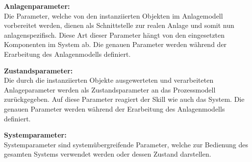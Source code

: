 	\textbf{Anlagenparameter:}
	\vspace{2mm} 
	\\
	Die Parameter, welche von den instanziierten Objekten im Anlagemodell vorbereitet werden, dienen als Schnittstelle zur realen Anlage und somit nun anlagenspezifisch. Diese Art dieser Parameter hängt von den eingesetzten Komponenten im System ab. Die genauen Parameter werden während der Erarbeitung des Anlagenmodells definiert.
	
	\textbf{Zustandsparameter:}
	\vspace{2mm} 
	\\
	Die durch die instanziierten Objekte ausgewerteten und verarbeiteten Anlageparameter werden als Zustandsparameter an das Prozessmodell zurückgegeben. Auf diese Parameter reagiert der Skill wie auch das System. Die genauen Parameter werden während der Erarbeitung des Anlagenmodells definiert.
	
	\textbf{Systemparameter:}
	\vspace{2mm} 
	\\
	Systemparameter sind systemübergreifende Parameter, welche zur Bedienung des gesamten Systems verwendet werden oder dessen Zustand darstellen. 